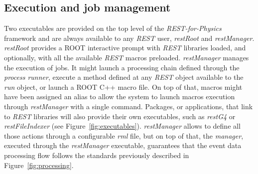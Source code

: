 

\subsection{Execution and job management}
Two executables are provided on the top level of the \emph{REST-for-Physics} framework and are always available to any \emph{REST} user, \emph{restRoot} and \emph{restManager}. 
\emph{restRoot} provides a ROOT interactive prompt with \emph{REST} libraries loaded, and optionally, with all the available \emph{REST} macros preloaded. 
\emph{restManager} manages the execution of jobs. It might launch a processing chain defined through the \emph{process runner}, execute a method defined at any \emph{REST} object available to the \emph{run} object, or launch a ROOT C++ macro file. On top of that, macros might have been assigned an alias to allow the system to launch macros execution through \emph{restManager} with a single command. Packages, or applications, that link to \emph{REST} libraries will also provide their own executables, such as \emph{restG4} or \emph{restFileIndexer}  (see Figure~\ref{fig:executables}). \emph{restManager} allows to define all those actions through a configurable \emph{rml} file, but on top of that, the \emph{manager}, executed through the \emph{restManager} executable, guarantees that the event data processing flow follows the standards previously described in Figure~\ref{fig:processing}.

